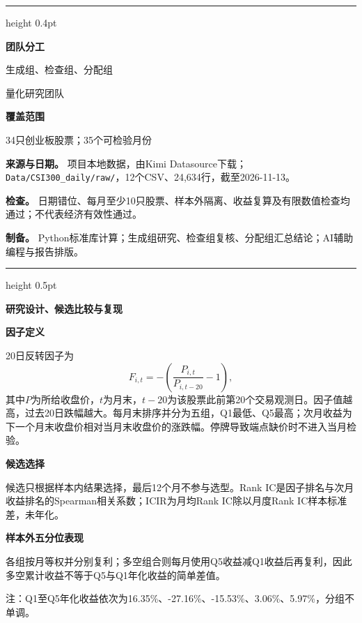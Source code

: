 \documentclass[a4paper,10pt]{article}
\newcommand{\DataDate}{2026-11-13}
\newcommand{\TeamName}{量化研究团队}
\newcommand{\ReportAuthor}{生成组、检查组、分配组}
\newcommand{\Coverage}{34只创业板股票；35个可检验月份}
\begin{document}
{\color{MemoRule}\hrule height 0.4pt}\medskip
\begin{minipage}[t]{0.36\textwidth}
\vspace{0pt}\small
\textbf{团队分工}\par\ReportAuthor\par\TeamName\par
\medskip\textbf{覆盖范围}\par\Coverage
\end{minipage}\hfill
\begin{minipage}[t]{0.60\textwidth}
\vspace{0pt}\footnotesize
\textbf{来源与日期。} 项目本地数据，由Kimi Datasource下载；\texttt{Data/CSI300\_daily/raw/}，12个CSV、24,634行，截至\DataDate。

\textbf{检查。} 日期错位、每月至少10只股票、样本外隔离、收益复算及有限数值检查均通过；不代表经济有效性通过。

\textbf{制备。} Python标准库计算；生成组研究、检查组复核、分配组汇总结论；AI辅助编程与报告排版。
\end{minipage}

\newpage
{\color{MemoBlue}\hrule height 0.5pt}\medskip
{\Large\bfseries 研究设计、候选比较与复现}\par\medskip

\textbf{因子定义}\par
20日反转因子为
\[
F_{i,t}=-\left(\frac{P_{i,t}}{P_{i,t-20}}-1\right),
\]
其中$P$为所给收盘价，$t$为月末，$t-20$为该股票此前第20个交易观测日。因子值越高，过去20日跌幅越大。每月末排序并分为五组，Q1最低、Q5最高；次月收益为下一个月末收盘价相对当月末收盘价的涨跌幅。停牌导致端点缺价时不进入当月检验。

\textbf{候选选择}\par
候选只根据样本内结果选择，最后12个月不参与选型。Rank IC是因子排名与次月收益排名的Spearman相关系数；ICIR为月均Rank IC除以月度Rank IC样本标准差，未年化。

\begin{center}
\label{tab:candidates}

\end{center}

\textbf{样本外五分位表现}\par
各组按月等权并分别复利；多空组合则每月使用Q5收益减Q1收益后再复利，因此多空累计收益不等于Q5与Q1年化收益的简单差值。
\begin{center}
\label{fig:quintiles}
\begin{minipage}{0.72\textwidth}

\end{minipage}
\end{center}
{\footnotesize 注：Q1至Q5年化收益依次为16.35\%、-27.16\%、-15.53\%、3.06\%、5.97\%，分组不单调。\par}
\end{document}
